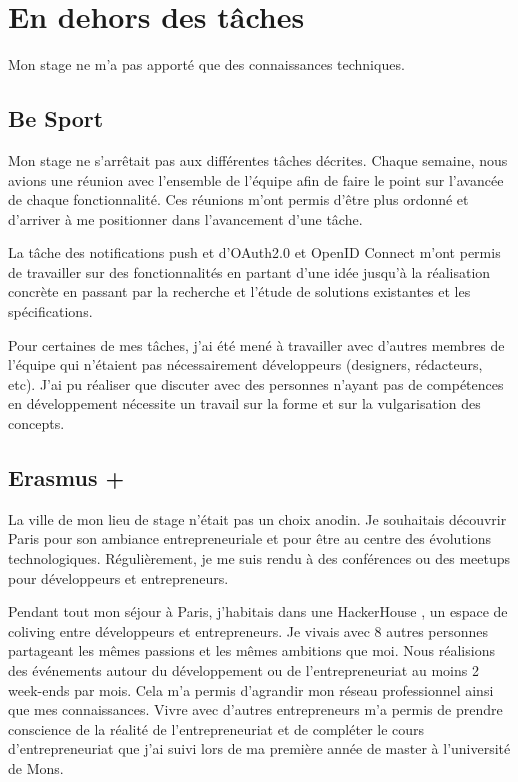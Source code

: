 \section{En dehors des tâches}

Mon stage ne m'a pas apporté que des connaissances techniques.

\subsection*{Be Sport}

Mon stage ne s'arrêtait pas aux différentes tâches décrites. Chaque semaine,
nous avions une réunion avec l'ensemble de l'équipe afin de faire le point sur
l'avancée de chaque fonctionnalité. Ces réunions m'ont permis d'être plus
ordonné et d'arriver à me positionner dans l'avancement d'une tâche.

La tâche des notifications push et d'OAuth2.0 et OpenID Connect m'ont permis de
travailler sur des fonctionnalités en partant d'une idée jusqu'à la réalisation
concrète en passant par la recherche et l'étude de solutions existantes et les
spécifications.

Pour certaines de mes tâches, j'ai été mené à travailler avec d'autres membres
de l'équipe qui n'étaient pas nécessairement développeurs (designers,
rédacteurs, etc). J'ai pu réaliser que discuter avec des personnes n'ayant pas
de compétences en développement nécessite un travail sur la forme et sur la vulgarisation des concepts.

\subsection*{Erasmus +}

La ville de mon lieu de stage n'était pas un choix anodin. Je souhaitais découvrir
Paris pour son ambiance entrepreneuriale et pour être au centre des évolutions
technologiques.
Régulièrement, je me suis rendu à des conférences ou des meetups pour
développeurs et entrepreneurs.

Pendant tout mon séjour à Paris, j'habitais dans une HackerHouse \cite{hackerhouse-website}, un espace de
coliving entre développeurs et entrepreneurs. Je vivais avec 8 autres personnes
partageant les mêmes passions et les mêmes ambitions que moi. Nous réalisions des événements autour du
développement ou de l'entrepreneuriat au moins 2 week-ends par mois. Cela m'a
permis d'agrandir mon réseau professionnel ainsi que mes connaissances.
Vivre avec d'autres entrepreneurs m'a permis de prendre conscience de la réalité
de l'entrepreneuriat et de compléter le cours d'entrepreneuriat que j'ai suivi
lors de ma première année de master à l'université de Mons.

